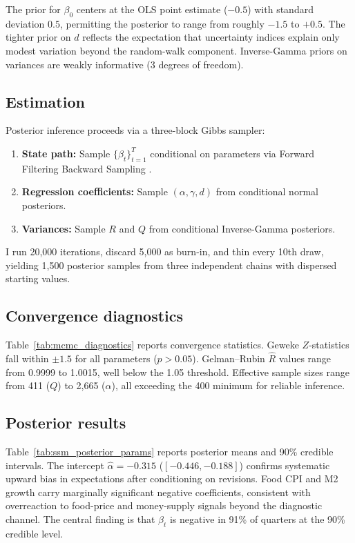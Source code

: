 The prior for $\beta_0$ centers at the OLS point estimate
($-0.5$) with standard deviation $0.5$, permitting the
posterior to range from roughly $-1.5$ to $+0.5$. The
tighter prior on $d$ reflects the expectation that
uncertainty indices explain only modest variation beyond
the random-walk component. Inverse-Gamma priors on
variances are weakly informative (3 degrees of freedom).

\subsection{Estimation}

Posterior inference proceeds via a three-block Gibbs
sampler:
\begin{enumerate}
  \item \textbf{State path:} Sample $\{\beta_t\}_{t=1}^T$
    conditional on parameters via Forward Filtering
    Backward Sampling \citep{CarterKohn1994}.
  \item \textbf{Regression coefficients:} Sample
    $(\alpha, \gamma, d)$ from conditional normal
    posteriors.
  \item \textbf{Variances:} Sample $R$ and $Q$ from
    conditional Inverse-Gamma posteriors.
\end{enumerate}

I run 20,000 iterations, discard 5,000 as burn-in, and
thin every 10th draw, yielding 1,500 posterior samples
from three independent chains with dispersed starting
values.

\subsection{Convergence diagnostics}

Table~\ref{tab:mcmc_diagnostics} reports convergence
statistics. Geweke $Z$-statistics fall within $\pm 1.5$
for all parameters ($p > 0.05$). Gelman--Rubin $\hat{R}$
values range from 0.9999 to 1.0015, well below the 1.05
threshold. Effective sample sizes range from 411 ($Q$) to
2,665 ($\alpha$), all exceeding the 400 minimum for
reliable inference.



\subsection{Posterior results}

Table~\ref{tab:ssm_posterior_params} reports posterior
means and 90\% credible intervals. The intercept
$\hat{\alpha} = -0.315$ ($[-0.446, -0.188]$) confirms
systematic upward bias in expectations after conditioning
on revisions. Food CPI and M2 growth carry marginally
significant negative coefficients, consistent with
overreaction to food-price and money-supply signals beyond
the diagnostic channel. The central finding is that
$\beta_t$ is negative in 91\% of quarters at the 90\%
credible level.


